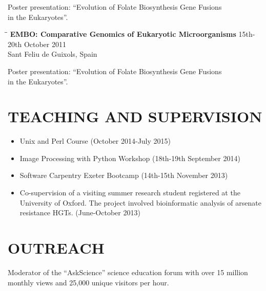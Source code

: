 \documentclass{res}
\begin{document}
\begin{resume}
\begin{tabbing}
   \end{tabbing}\vspace{-20pt}      
      Poster presentation: ``Evolution of Folate Biosynthesis Gene Fusions \\in the Eukaryotes''.
      
  
  \vspace{-0.1in}
     \begin{tabbing} 
   \hspace{2in}\= \hspace{2.6in}\= \kill 
    {\bf EMBO: Comparative Genomics of Eukaryotic Microorganisms}
    \>  \> 15th-20th October 2011\\
                         \>    \> Sant Feliu de Guixols, Spain
   \end{tabbing}\vspace{-20pt}      
      Poster presentation: ``Evolution of Folate Biosynthesis Gene Fusions \\in the Eukaryotes''.

  \section{TEACHING AND SUPERVISION}
  \begin{itemize}
          \vspace{-1pt}
      \item Unix and Perl Course (October 2014-July 2015)
      \item Image Processing with Python Workshop (18th-19th September 2014)
      \item Software Carpentry Exeter Bootcamp (14th-15th November 2013)
      \item Co-supervision of a visiting summer research student registered at the University of Oxford. The project involved bioinformatic analysis of arsenate resistance HGTs. (June-October 2013)
  \end{itemize}
 \section{OUTREACH}          
 \vspace{5pt}
Moderator of the ``AskScience'' science education forum with over 15 million monthly views and 25,000 unique visitors per hour.
\vspace{-5pt}

\end{resume}
\end{document}
